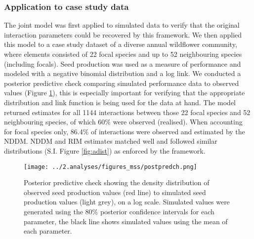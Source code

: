 \documentclass[a4,12pt]{article}
\begin{document}
    \subsubsection*{Application to case study data}

        The joint model was first applied to simulated data to verify that the original interaction parameters could be recovered by this framework. We then applied this model to a case study dataset of a diverse annual wildflower community, where elements consisted of 22 focal species and up to 52 neighbouring species (including focals). Seed production was used as a measure of performance and modeled with a negative binomial distribution and a log link. We conducted a posterior predictive check comparing simulated performance data to observed values (Figure \ref{fig:ppcheck}), this is especially important for verifying that the appropriate distribution and link function is being used for the data at hand. The model returned estimates for all 1144 interactions between those 22 focal species and 52 neighbouring species, of which 60\% were observed (realised).  When accounting for focal species only, 86.4\% of interactions were observed and estimated by the NDDM. NDDM and RIM estimates matched well and followed similar distributions (S.I. Figure \ref{fig:adist}) as enforced by the framework. 
    





    \begin{figure}[H]
        \texttt{[image: ../2.analyses/figures\_mss/postpredch.png]}
        \caption{Posterior predictive check showing the density distribution of observed seed production values (red line) to simulated seed production values (light grey), on a log scale. Simulated values were generated using the 80\% posterior confidence intervals for each parameter, the black line shows simulated values using the mean of each parameter. }
        \label{fig:ppcheck}
    \end{figure}
  
\end{document}
